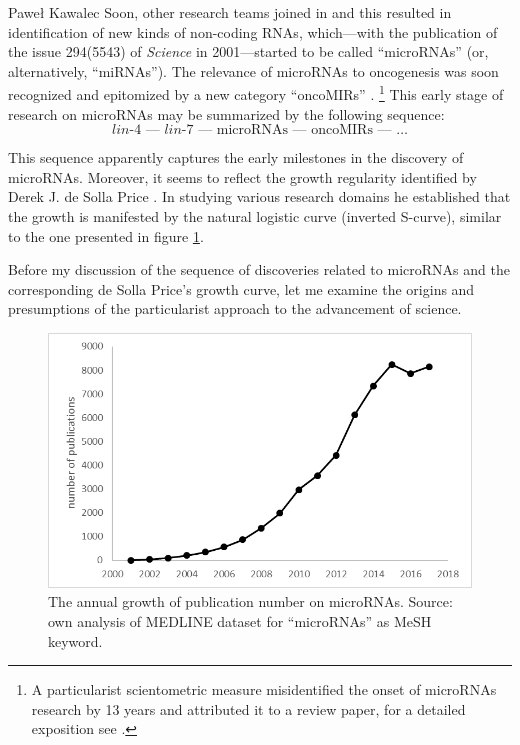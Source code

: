 \begin{artengenv}{Paweł Kawalec}
Soon, other research teams joined in and this resulted in identification of new kinds of non-coding RNAs, which---with the publication of the issue 294(5543) of \textit{Science} in 2001---started to be called ``microRNAs'' (or, alternatively, ``miRNAs''). The relevance of microRNAs to oncogenesis was soon recognized
\parencite[][]{calin_frequent_2002} %
 and epitomized by a new category ``oncoMIRs'' 
\parencite[][]{he_oncomir_2019}.%
\footnote{A particularist scientometric measure misidentified the onset of microRNAs research by 13 years and attributed it to a review paper, for a detailed exposition see 
\parencite[][]{giovagnoli_cognitive_2020}.%
} This early stage of research 
\parencite[][]{kawalec_transformations_2018} %
 on microRNAs may be summarized by the following sequence:
$$
\textit{lin-4 –– lin-7}\text{ –– microRNAs –– oncoMIRs –– \ldots}
$$

This sequence apparently captures the early milestones in the discovery of microRNAs. Moreover, it seems to reflect the growth regularity identified by Derek J. de Solla Price
\parencite[de][]{de_solla_price_little_1986}. %
 In studying various research domains he established that the growth is manifested by the natural logistic curve (inverted S-curve), similar to the one presented in figure \ref{fig1kawalec}.

Before my discussion of the sequence of discoveries related to microRNAs and the corresponding de Solla Price's growth curve, let me examine the origins and presumptions of the particularist approach to the advancement of science.
\begin{figure}[h!]
	\includegraphics[width=1\textwidth]{ART_Kawalec/Kawalec-img001bw.png}
	\caption{The annual growth of publication number on microRNAs. Source: own analysis of MEDLINE dataset for ``microRNAs'' as MeSH keyword.}\label{fig1kawalec}
\end{figure}




\end{artengenv}
